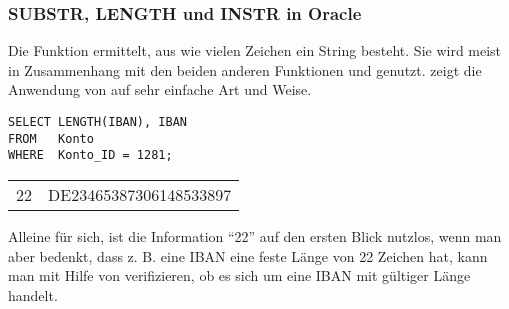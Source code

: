 \subsubsection{SUBSTR, LENGTH und INSTR in Oracle}
Die Funktion  ermittelt, aus wie vielen Zeichen
ein String besteht. Sie wird meist in Zusammenhang mit den beiden
anderen Funktionen  und 
genutzt.  zeigt die Anwendung von
 auf sehr einfache Art und Weise.
\begin{lstlisting}[language=oracle_sql,caption={Die \languageorasql{LENGTH}-Funktion},label=sql03_04]
SELECT LENGTH(IBAN), IBAN
FROM   Konto
WHERE  Konto_ID = 1281;
          \end{lstlisting}
\clearpage
\begin{center}
    \begin{small}
        \tablehead{}
        \tabletail {
        }
        \begin{oraclesql}
            \begin{supertabular}{rl}
                22 & DE23465387306148533897 \\
            \end{supertabular}
        \end{oraclesql}
    \end{small}
\end{center}
Alleine für sich, ist die Information \enquote{22} auf den ersten Blick nutzlos, wenn man aber bedenkt, dass z. B. eine IBAN eine feste Länge von 22 Zeichen hat, kann man mit Hilfe von  verifizieren, ob es sich um eine IBAN mit
gültiger Länge handelt.

